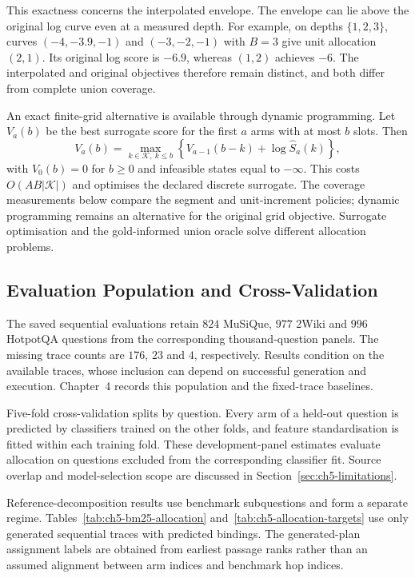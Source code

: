 This exactness concerns the interpolated envelope. The envelope can lie
above the original log curve even at a measured depth. For example, on
depths $\{1,2,3\}$, curves $(-4,-3.9,-1)$ and $(-3,-2,-1)$ with $B=3$
give unit allocation $(2,1)$. Its original log score is $-6.9$, whereas
$(1,2)$ achieves $-6$. The interpolated and original objectives therefore
remain distinct, and both differ from complete union coverage.

An exact finite-grid alternative is available through dynamic programming.
Let $V_a(b)$ be the best surrogate score for the first $a$ arms with at most
$b$ slots. Then
\begin{equation}
  V_a(b)=\max_{k\in\mathcal K,\ k\leq b}
       \left\{V_{a-1}(b-k)+\log\widehat S_a(k)\right\},
  \label{eq:ch5-allocation-dp}
\end{equation}
with $V_0(b)=0$ for $b\geq0$ and infeasible states equal to $-\infty$.
This costs $O(AB|\mathcal K|)$ and optimises the declared discrete
surrogate. The coverage measurements below compare the segment and
unit-increment policies; dynamic programming remains an alternative for
the original grid objective.
Surrogate optimisation and the gold-informed union oracle solve different
allocation problems.

\subsection{Evaluation Population and Cross-Validation}

The saved sequential evaluations retain $824$ MuSiQue, $977$ 2Wiki and
$996$ HotpotQA questions from the corresponding thousand-question panels.
The missing trace counts are $176$, $23$ and $4$, respectively. Results
condition on the available traces, whose inclusion can depend on successful
generation and execution. Chapter~4 records this population and the
fixed-trace baselines.

Five-fold cross-validation splits by question. Every arm of a held-out
question is predicted by classifiers trained on the other folds, and feature
standardisation is fitted within each training fold. These development-panel
estimates evaluate allocation on questions excluded from the corresponding
classifier fit. Source overlap and model-selection scope are discussed in
Section~\ref{sec:ch5-limitations}.

Reference-decomposition results use benchmark subquestions and form a
separate regime. Tables~\ref{tab:ch5-bm25-allocation}
and~\ref{tab:ch5-allocation-targets} use only generated sequential traces
with predicted bindings. The generated-plan assignment labels are obtained
from earliest passage ranks rather than an assumed alignment between arm
indices and benchmark hop indices.

